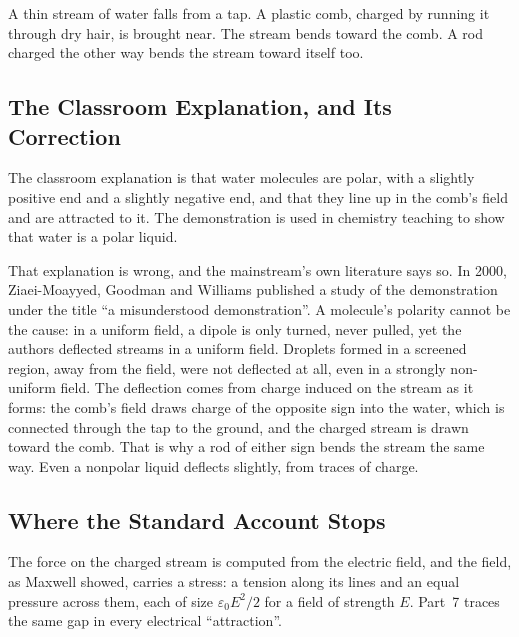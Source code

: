 \documentclass[11pt,a4paper]{article}
\begin{document}
A thin stream of water falls from a tap. A plastic comb, charged by running it through dry hair, is brought near. The stream bends toward the comb. A rod charged the other way bends the stream toward itself too.

\subsection*{The Classroom Explanation, and Its Correction}

The classroom explanation is that water molecules are polar, with a slightly positive end and a slightly negative end, and that they line up in the comb's field and are attracted to it. The demonstration is used in chemistry teaching to show that water is a polar liquid.

That explanation is wrong, and the mainstream's own literature says so. In 2000, Ziaei-Moayyed, Goodman and Williams published a study of the demonstration under the title ``a misunderstood demonstration''. A molecule's polarity cannot be the cause: in a uniform field, a dipole is only turned, never pulled, yet the authors deflected streams in a uniform field. Droplets formed in a screened region, away from the field, were not deflected at all, even in a strongly non-uniform field. The deflection comes from charge induced on the stream as it forms: the comb's field draws charge of the opposite sign into the water, which is connected through the tap to the ground, and the charged stream is drawn toward the comb. That is why a rod of either sign bends the stream the same way. Even a nonpolar liquid deflects slightly, from traces of charge.


\subsection*{Where the Standard Account Stops}

The force on the charged stream is computed from the electric field, and the field, as Maxwell showed, carries a stress: a tension along its lines and an equal pressure across them, each of size $\varepsilon_0E^2/2$ for a field of strength $E$.  Part~7 traces the same gap in every electrical ``attraction''.
\end{document}
